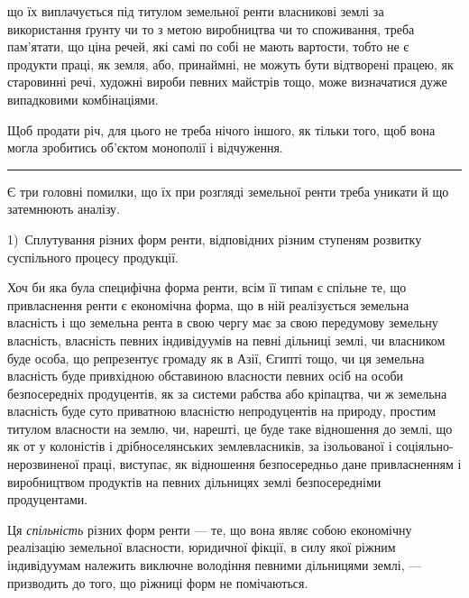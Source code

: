\parcont{}  %
що їх виплачується під титулом земельної ренти власникові землі за використання
ґрунту чи то з метою виробництва чи то споживання, треба пам’ятати, що
ціна речей, які самі по собі не мають вартости, тобто не є продукти праці, як
земля, або, принаймні, не можуть бути відтворені працею, як старовинні речі,
художні вироби певних майстрів тощо, може визначатися дуже випадковими
комбінаціями.

Щоб продати річ, для цього не треба нічого іншого, як тільки того, щоб
вона могла зробитись об’єктом монополії і відчуження.

\pfbreak{} %

Є три головні помилки, що їх при розгляді земельної ренти треба уникати
й що затемнюють аналізу.

1)~Сплутування різних форм ренти, відповідних різним ступеням розвитку
суспільного процесу продукції.

Хоч би яка була специфічна форма ренти, всім її типам є спільне те, що привласнення
ренти є економічна форма, що в ній реалізується земельна власність і що
земельна рента в свою чергу має за свою передумову земельну власність, власність
певних індивідуумів на певні дільниці землі, чи власником буде особа, що репрезентує
громаду як в Азії, Єгипті тощо, чи ця земельна власність буде привхідною
обставиною власности певних осіб на особи безпосередніх продуцентів, як за системи
рабства або кріпацтва, чи ж земельна власність буде суто приватною
власністю непродуцентів на природу, простим титулом власности на землю, чи,
нарешті, це буде таке відношення до землі, що як от у колоністів і дрібноселянських
землевласників, за ізольованої і соціяльно-нерозвиненої праці, виступає,
як відношення безпосередньо дане привласненням і виробництвом продуктів
на певних дільницях землі безпосередніми продуцентами.

Ця \emph{спільність} різних форм ренти — те, що вона являє собою економічну
реалізацію земельної власности, юридичної фікції, в силу якої ріжним індивідуумам
належить виключне володіння певними дільницями землі, — призводить до
того, що ріжниці форм не помічаються.

